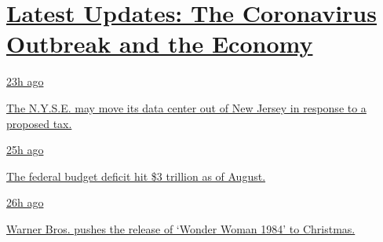 \hypertarget{latest-updates-the-coronavirus-outbreak-and-the-economy}{%
\section{\texorpdfstring{\href{https://www.nytimes3xbfgragh.onion/live/2020/09/11/business/stock-market-today-coronavirus?action=click\&pgtype=Article\&state=default\&region=MAIN_CONTENT_1\&context=storylines_live_updates}{Latest
Updates: The Coronavirus Outbreak and the
Economy}}{Latest Updates: The Coronavirus Outbreak and the Economy}}\label{latest-updates-the-coronavirus-outbreak-and-the-economy}}

\href{https://www.nytimes3xbfgragh.onion/live/2020/09/11/business/stock-market-today-coronavirus?action=click\&pgtype=Article\&state=default\&region=MAIN_CONTENT_1\&context=storylines_live_updates\#the-nyse-may-move-its-data-center-out-of-new-jersey-in-response-to-a-proposed-tax}{23h
ago}

\href{https://www.nytimes3xbfgragh.onion/live/2020/09/11/business/stock-market-today-coronavirus?action=click\&pgtype=Article\&state=default\&region=MAIN_CONTENT_1\&context=storylines_live_updates\#the-nyse-may-move-its-data-center-out-of-new-jersey-in-response-to-a-proposed-tax}{The
N.Y.S.E. may move its data center out of New Jersey in response to a
proposed tax.}

\href{https://www.nytimes3xbfgragh.onion/live/2020/09/11/business/stock-market-today-coronavirus?action=click\&pgtype=Article\&state=default\&region=MAIN_CONTENT_1\&context=storylines_live_updates\#the-federal-budget-deficit-hit-3-trillion-as-of-august}{25h
ago}

\href{https://www.nytimes3xbfgragh.onion/live/2020/09/11/business/stock-market-today-coronavirus?action=click\&pgtype=Article\&state=default\&region=MAIN_CONTENT_1\&context=storylines_live_updates\#the-federal-budget-deficit-hit-3-trillion-as-of-august}{The
federal budget deficit hit \$3 trillion as of August.}

\href{https://www.nytimes3xbfgragh.onion/live/2020/09/11/business/stock-market-today-coronavirus?action=click\&pgtype=Article\&state=default\&region=MAIN_CONTENT_1\&context=storylines_live_updates\#warner-bros-pushes-the-release-of-wonder-woman-1984-to-christmas}{26h
ago}

\href{https://www.nytimes3xbfgragh.onion/live/2020/09/11/business/stock-market-today-coronavirus?action=click\&pgtype=Article\&state=default\&region=MAIN_CONTENT_1\&context=storylines_live_updates\#warner-bros-pushes-the-release-of-wonder-woman-1984-to-christmas}{Warner
Bros. pushes the release of `Wonder Woman 1984' to Christmas.}

